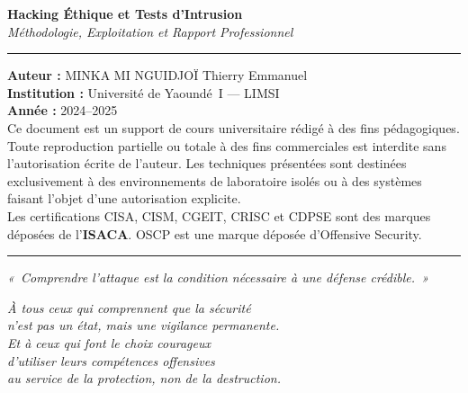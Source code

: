 \documentclass[12pt, a4paper, twoside, openright]{book}
\begin{document}
\begin{center}
    \begin{minipage}{0.78\textwidth}
        \footnotesize\color{CouleurBordInfo}
        \begin{center}
            {\bfseries\color{CouleurPrimaire}
                Hacking Éthique et Tests d'Intrusion}\\[0.4ex]
            {\itshape Méthodologie, Exploitation et Rapport Professionnel}
        \end{center}
        \vspace{0.8ex}
        \hrule
        \vspace{0.8ex}
        \textbf{Auteur :} MINKA MI NGUIDJOÏ Thierry Emmanuel\\
        \textbf{Institution :} Université de Yaoundé~I — LIMSI\\
        \textbf{Année :} 2024--2025\\[0.5ex]
        Ce document est un support de cours universitaire rédigé à des fins
        pédagogiques. Toute reproduction partielle ou totale à des fins commerciales
        est interdite sans l'autorisation écrite de l'auteur. Les techniques
        présentées sont destinées exclusivement à des environnements de laboratoire
        isolés ou à des systèmes faisant l'objet d'une autorisation explicite.\\[0.5ex]
        Les certifications CISA, CISM, CGEIT, CRISC et CDPSE sont des marques
        déposées de l'\textbf{ISACA}. OSCP est une marque déposée d'Offensive Security.\\[0.8ex]
        \hrule
        \vspace{0.5ex}
        {\centering\itshape
        «~Comprendre l'attaque est la condition nécessaire à une défense crédible.~»}
    \end{minipage}
\end{center}

\vspace*{\fill}

\clearpage
\thispagestyle{empty}
\vspace*{3cm}
\begin{flushright}
    \begin{minipage}{0.62\textwidth}
        \itshape\large\color{CouleurPrimaire}
        À tous ceux qui comprennent que la sécurité\\
        n'est pas un état, mais une vigilance permanente.\\[1.5ex]
        \normalsize\normalfont\color{CouleurAccent}
        Et à ceux qui font le choix courageux\\
        d'utiliser leurs compétences offensives\\
        au service de la protection, non de la destruction.
    \end{minipage}
\end{flushright}
\end{document}
